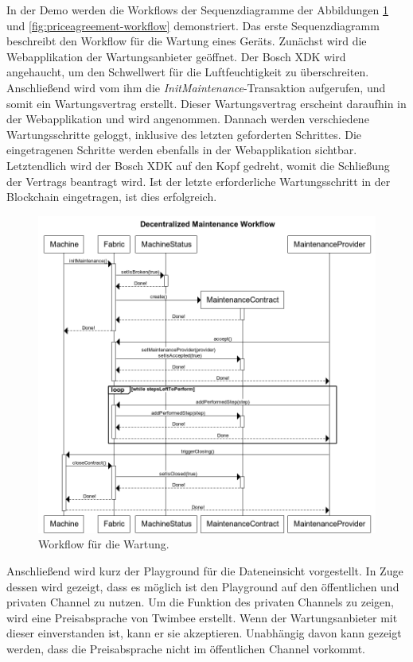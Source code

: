 In der Demo werden die Workflows der Sequenzdiagramme der Abbildungen \ref{fig:maintenance-workflow} und \ref{fig:priceagreement-workflow} demonstriert. Das erste Sequenzdiagramm beschreibt den Workflow für die Wartung eines Geräts. Zunächst wird die Webapplikation der Wartungsanbieter geöffnet. Der Bosch XDK wird angehaucht, um den Schwellwert für die Luftfeuchtigkeit zu überschreiten. Anschließend wird vom ihm die \textit{InitMaintenance}-Transaktion aufgerufen, und somit ein Wartungsvertrag erstellt. Dieser Wartungsvertrag erscheint daraufhin in der Webapplikation und wird angenommen. Dannach werden verschiedene Wartungsschritte geloggt, inklusive des letzten geforderten Schrittes. Die eingetragenen Schritte werden ebenfalls in der Webapplikation sichtbar. Letztendlich wird der Bosch XDK auf den Kopf gedreht, womit die Schließung der Vertrags beantragt wird. Ist der letzte erforderliche Wartungsschritt in der Blockchain eingetragen, ist dies erfolgreich.

\begin{figure}[!htbp]
    \centering
      \includegraphics[width=1.0\textwidth,angle=0]{images/maintenance-workflow}
       \caption{Workflow für die Wartung.}
      \label{fig:maintenance-workflow}
\end{figure}

Anschließend wird kurz der Playground für die Dateneinsicht vorgestellt. In Zuge dessen wird gezeigt, dass es möglich ist den Playground auf den öffentlichen und privaten Channel zu nutzen. Um die Funktion des privaten Channels zu zeigen, wird eine Preisabsprache von Twimbee erstellt. Wenn der Wartungsanbieter mit dieser einverstanden ist, kann er sie akzeptieren. Unabhängig davon kann gezeigt werden, dass die Preisabsprache nicht im öffentlichen Channel vorkommt.

